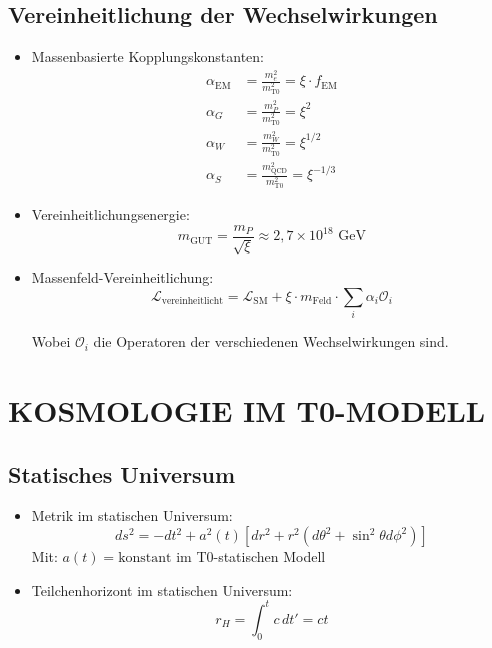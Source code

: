 \documentclass[12pt,a4paper]{article}
\begin{document}
\subsection{Vereinheitlichung der Wechselwirkungen}
\begin{itemize}
	\item Massenbasierte Kopplungskonstanten:
	\begin{align}
		\alpha_{\text{EM}} &= \frac{m_e^2}{m_{\text{T0}}^2} = \xi \cdot f_{\text{EM}} \\
		\alpha_G &= \frac{m_P^2}{m_{\text{T0}}^2} = \xi^2 \\
		\alpha_W &= \frac{m_W^2}{m_{\text{T0}}^2} = \xi^{1/2} \\
		\alpha_S &= \frac{m_{\text{QCD}}^2}{m_{\text{T0}}^2} = \xi^{-1/3}
	\end{align}
	
	\item Vereinheitlichungsenergie:
	\begin{equation}
		m_{\text{GUT}} = \frac{m_P}{\sqrt{\xi}} \approx 2,7 \times 10^{18} \text{ GeV}
	\end{equation}
	
	\item Massenfeld-Vereinheitlichung:
	\begin{equation}
		\mathcal{L}_{\text{vereinheitlicht}} = \mathcal{L}_{\text{SM}} + \xi \cdot m_{\text{Feld}} \cdot \sum_i \alpha_i \mathcal{O}_i
	\end{equation}
	
	Wobei $\mathcal{O}_i$ die Operatoren der verschiedenen Wechselwirkungen sind.
\end{itemize}	
	\section{KOSMOLOGIE IM T0-MODELL}

\subsection{Statisches Universum}
\begin{itemize}
	\item Metrik im statischen Universum:
	\begin{equation}
		ds^2 = -dt^2 + a^2(t)[dr^2 + r^2(d\theta^2 + \sin^2\theta d\phi^2)]
	\end{equation}
	Mit: $a(t) = \text{konstant}$ im T0-statischen Modell
	
	\item Teilchenhorizont im statischen Universum:
	\begin{equation}
		r_H = \int_0^t c \, dt' = ct
	\end{equation}
\end{itemize}
\end{document}
